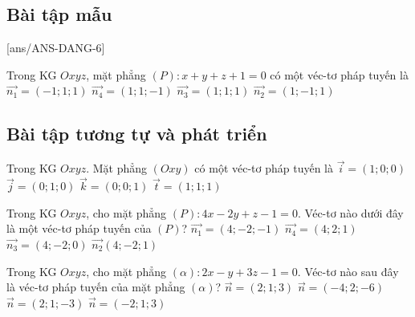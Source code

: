 \subsection{Bài tập mẫu}
[ans/ANS-DANG-6]
\begin{khung}
\begin{vd}%
	Trong KG $Oxyz$, mặt phẳng $(P)\colon x+y+z+1=0$ có một véc-tơ pháp tuyến là
	\choice
	{$\overrightarrow{n_1}=(-1;1;1)$}
	{$\overrightarrow{n_4}=(1;1;-1)$}
	{\True $\overrightarrow{n_3}=(1;1;1)$}
	{$\overrightarrow{n_2}=(1;-1;1)$}
\end{vd}
\end{khung}

\subsection{Bài tập tương tự và phát triển}
\begin{ex}%
	Trong KG $Oxyz$. Mặt phẳng $(Oxy)$ có một véc-tơ pháp tuyến là
	\choice
	{$\overrightarrow{i}=(1;0;0)$}
	{$\overrightarrow{j}=(0;1;0)$}
	{\True $\overrightarrow{k}=(0;0;1)$}
	{$\overrightarrow{t}=(1;1;1)$}
\end{ex}
\begin{ex}%
	Trong KG $Oxyz$, cho mặt phẳng $(P) \colon 4x-2y+z-1=0$. Véc-tơ nào dưới đây là một véc-tơ pháp tuyến của $(P)$?
	\choice
	{$\overrightarrow{n_1}=(4;-2;-1)$}
	{$\overrightarrow{n_4}=(4;2;1)$}
	{$\overrightarrow{n_3}=(4;-2;0)$}
	{\True $\overrightarrow{n_2}(4;-2;1)$}
\end{ex}

\begin{ex}%
	Trong KG $Oxyz$, cho mặt phẳng $(\alpha) \colon 2x-y+3z-1=0$. Véc-tơ nào sau đây là véc-tơ pháp tuyến của mặt phẳng $(\alpha)$?
	\choice
	{$\overrightarrow{n}=(2;1;3)$}
	{\True $\overrightarrow{n}=(-4;2;-6)$}
	{$\overrightarrow{n}=(2;1;-3)$}
	{$\overrightarrow{n}=(-2;1;3)$}
\end{ex}

